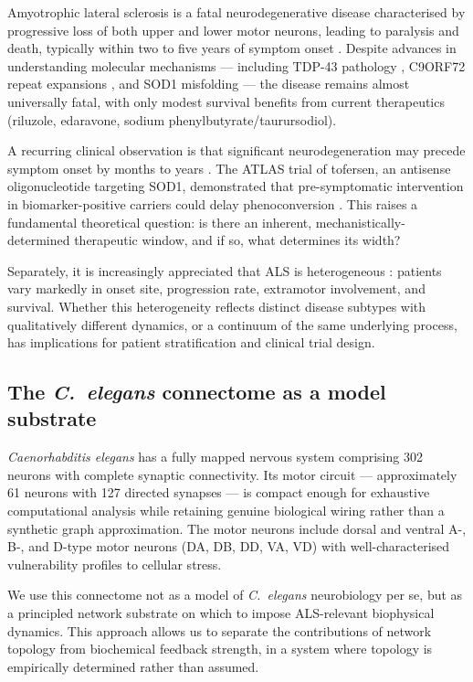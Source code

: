 \documentclass[12pt,a4paper]{article}
\begin{document}
Amyotrophic lateral sclerosis is a fatal neurodegenerative disease characterised by progressive
loss of both upper and lower motor neurons, leading to paralysis and death, typically within two
to five years of symptom onset \citep{vanes2017}. Despite advances in understanding molecular
mechanisms --- including TDP-43 pathology \citep{neumann2006}, C9ORF72 repeat expansions
\citep{dejesus2011}, and SOD1 misfolding \citep{rosen1993} --- the disease remains almost
universally fatal, with only modest survival benefits from current therapeutics (riluzole,
edaravone, sodium phenylbutyrate/taurursodiol).

A recurring clinical observation is that significant neurodegeneration may precede symptom
onset by months to years \citep{turner2012,benatar2019}. The ATLAS trial of tofersen, an
antisense oligonucleotide targeting SOD1, demonstrated that pre-symptomatic intervention in
biomarker-positive carriers could delay phenoconversion \citep{benatar2023}. This raises a
fundamental theoretical question: is there an inherent, mechanistically-determined therapeutic
window, and if so, what determines its width?

Separately, it is increasingly appreciated that ALS is heterogeneous \citep{alchalabi2017}:
patients vary markedly in onset site, progression rate, extramotor involvement, and survival.
Whether this heterogeneity reflects distinct disease subtypes with qualitatively different
dynamics, or a continuum of the same underlying process, has implications for patient
stratification and clinical trial design.

\subsection{The \textit{C.~elegans} connectome as a model substrate}

\textit{Caenorhabditis elegans} has a fully mapped nervous system
\citep{white1986,cook2019} comprising 302 neurons with complete synaptic connectivity. Its
motor circuit --- approximately 61 neurons with 127 directed synapses --- is compact enough for
exhaustive computational analysis while retaining genuine biological wiring rather than a
synthetic graph approximation. The motor neurons include dorsal and ventral A-, B-, and D-type
motor neurons (DA, DB, DD, VA, VD) with well-characterised vulnerability profiles to cellular
stress.

We use this connectome not as a model of \textit{C.~elegans} neurobiology per se, but as a
principled network substrate on which to impose ALS-relevant biophysical dynamics. This
approach allows us to separate the contributions of network topology from biochemical feedback
strength, in a system where topology is empirically determined rather than assumed.
\end{document}
